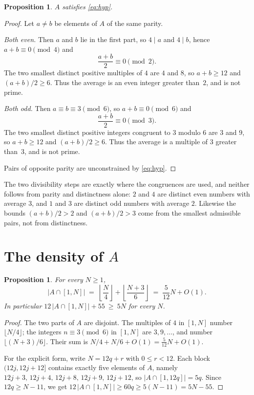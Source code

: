 \documentclass[11pt]{article}
\theoremstyle{plain}
\newtheorem{proposition}[theorem]{Proposition}
\theoremstyle{definition}
\theoremstyle{remark}
\begin{document}
\begin{proposition}\label{prop:adm}
$A$ satisfies \eqref{eq:hyp}.
\end{proposition}

\begin{proof}
Let $a\ne b$ be elements of $A$ of the same parity.

\emph{Both even.} Then $a$ and $b$ lie in the first part, so $4\mid a$ and
$4\mid b$, hence $a+b\equiv0\pmod 4$ and
\[
  \frac{a+b}{2}\equiv 0 \pmod 2 .
\]
The two smallest distinct positive multiples of $4$ are $4$ and $8$, so
$a+b\ge12$ and $(a+b)/2\ge6$. Thus the average is an even integer greater
than~$2$, and is not prime.

\emph{Both odd.} Then $a\equiv b\equiv3\pmod 6$, so $a+b\equiv0\pmod 6$ and
\[
  \frac{a+b}{2}\equiv 0 \pmod 3 .
\]
The two smallest distinct positive integers congruent to $3$ modulo $6$ are
$3$ and $9$, so $a+b\ge12$ and $(a+b)/2\ge6$. Thus the average is a multiple
of $3$ greater than~$3$, and is not prime.

Pairs of opposite parity are unconstrained by \eqref{eq:hyp}. \end{proof}

The two divisibility steps are exactly where the congruences are used, and
neither follows from parity and distinctness alone: $2$ and $4$ are distinct
even numbers with average $3$, and $1$ and $3$ are distinct odd numbers with
average $2$. Likewise the bounds $(a+b)/2>2$ and $(a+b)/2>3$ come from the
smallest admissible pairs, not from distinctness.

\section{The density of \texorpdfstring{$A$}{A}}

\begin{proposition}\label{prop:count}
For every $N\ge1$,
\[
  |A\cap[1,N]| \;=\; \left\lfloor\frac N4\right\rfloor
                   + \left\lfloor\frac{N+3}{6}\right\rfloor
               \;=\; \frac{5}{12}N+O(1).
\]
In particular $12\,|A\cap[1,N]|+55\ \ge\ 5N$ for every $N$.
\end{proposition}

\begin{proof}
The two parts of $A$ are disjoint. The multiples of $4$ in $[1,N]$ number
$\lfloor N/4\rfloor$; the integers $n\equiv3\pmod 6$ in $[1,N]$ are
$3,9,\ldots$, and number $\lfloor (N+3)/6\rfloor$. Their sum is
$N/4+N/6+O(1)=\tfrac5{12}N+O(1)$.

For the explicit form, write $N=12q+r$ with $0\le r<12$. Each block
$(12j,12j+12]$ contains exactly five elements of $A$, namely
$12j+3,\,12j+4,\,12j+8,\,12j+9,\,12j+12$, so $|A\cap[1,12q]|=5q$. Since
$12q\ge N-11$, we get $12\,|A\cap[1,N]|\ge 60q\ge 5(N-11)=5N-55$.
\end{proof}
\end{document}

